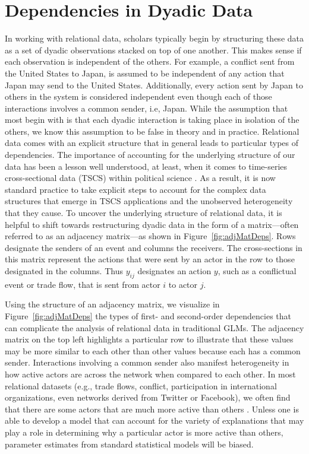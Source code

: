 \section{\textbf{Dependencies in Dyadic Data}}

In working with relational data, scholars typically begin by structuring these data as a set of dyadic observations stacked on top of one another. This makes sense if each observation is independent of the others. For example, a conflict sent from the United States to Japan, is assumed to be independent of any action that Japan may send to the United States. Additionally, every action sent by Japan to others in the system is considered independent even though each of those interactions involves a common sender, i.e, Japan. While the assumption that most begin with is that each dyadic interaction is taking place in isolation of the others, we know this assumption to be false in theory and in practice. Relational data comes with an explicit structure that in general leads to particular types of dependencies. The importance of accounting for the underlying structure of our data has been a lesson well understood, at least, when it comes to time-series cross-sectional data (TSCS) within political science \citep{beck:katz:1995,beck:etal:1998}. As a result, it is now standard practice to take explicit steps to account for the complex data structures that emerge in TSCS applications and the unobserved heterogeneity that they cause. To uncover the underlying structure of relational data, it is helpful to shift towards restructuring dyadic data in the form of a matrix---often referred to as an adjacency matrix---as shown in Figure~\ref{fig:adjMatDeps}. Rows designate the senders of an event and columns the receivers. The cross-sections in this matrix represent the actions that were sent by an actor in the row to those designated in the columns. Thus $y_{ij}$ designates an action $y$, such as a conflictual event or trade flow, that is sent from actor $i$ to actor $j$. 

Using the structure of an adjacency matrix, we visualize in Figure~\ref{fig:adjMatDeps} the types of first- and second-order dependencies that can complicate the analysis of relational data in traditional GLMs. The adjacency matrix on the top left highlights a particular row to illustrate that these values may be more similar to each other than other values because each has a common sender. Interactions involving a common sender also manifest heterogeneity in how active actors are across the network when compared to each other. In most relational datasets (e.g., trade flows, conflict, participation in international organizations, even networks derived from Twitter or Facebook), we often find that there are some actors that are much more active than others \citep{barabasi:reka:1999}. Unless one is able to develop a model that can account for the variety of explanations that may play a role in determining why a particular actor is more active than others, parameter estimates from standard statistical models will be biased.


